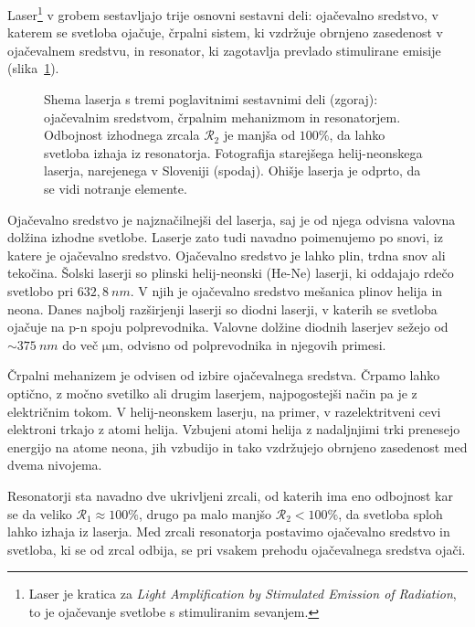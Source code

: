 Laser\footnote{Laser je kratica za {\it Light Amplification by Stimulated
Emission of Radiation}, to je ojačevanje svetlobe s stimuliranim sevanjem.} 
v grobem sestavljajo trije osnovni sestavni deli: ojačevalno sredstvo, 
v katerem se svetloba ojačuje, črpalni sistem, ki vzdržuje obrnjeno zasedenost
v ojačevalnem sredstvu, in resonator, ki zagotavlja prevlado stimulirane emisije
(slika~\ref{fig:11_laser}).

\begin{figure}[h!]
\centering
\def\svgwidth{100truemm} 

\caption{Shema laserja s tremi poglavitnimi sestavnimi deli (zgoraj): 
ojačevalnim sredstvom, črpalnim mehanizmom in resonatorjem. Odbojnost 
izhodnega zrcala $\mathcal{R}_2$ je manjša od $100\%$, da lahko svetloba 
izhaja iz resonatorja. Fotografija starejšega helij-neonskega laserja, 
narejenega v Sloveniji (spodaj). Ohišje laserja je odprto, da se vidi notranje elemente.
}
\label{fig:11_laser}
\end{figure}

Ojačevalno sredstvo je najznačilnejši del laserja, saj je od njega odvisna 
valovna dolžina izhodne svetlobe. Laserje zato tudi navadno poimenujemo
po snovi, iz katere je ojačevalno sredstvo.
Ojačevalno sredstvo je lahko plin, trdna snov ali tekočina.  
Šolski laserji so plinski helij-neonski (He-Ne) laserji, ki oddajajo 
rdečo svetlobo pri $632,8~\si{nm}$. V njih je ojačevalno sredstvo
mešanica plinov helija in neona. Danes najbolj razširjenji laserji so 
diodni laserji, v katerih se svetloba ojačuje na p-n spoju polprevodnika. 
Valovne dolžine diodnih laserjev sežejo od $\sim 375~\si{nm}$ do več 
$\si{\micro\meter}$, odvisno od polprevodnika in njegovih primesi.

Črpalni mehanizem je odvisen od izbire ojačevalnega sredstva. Črpamo lahko 
optično, z močno svetilko ali drugim laserjem, najpogostejši način pa je z
električnim tokom. V helij-neonskem laserju, na primer, v razelektritveni 
cevi elektroni trkajo z atomi helija. Vzbujeni atomi helija z nadaljnjimi
trki prenesejo energijo na atome neona, jih vzbudijo in tako vzdržujejo 
obrnjeno zasedenost med dvema nivojema.

Resonatorji sta navadno dve ukrivljeni zrcali, od katerih ima eno odbojnost
kar se da veliko $\mathcal{R}_1 \approx 100\%$, drugo pa malo manjšo 
$\mathcal{R}_2 < 100\%$, da svetloba sploh lahko izhaja iz laserja. 
Med zrcali resonatorja postavimo ojačevalno sredstvo in svetloba, ki se od 
zrcal odbija, se pri vsakem prehodu ojačevalnega sredstva ojači.

